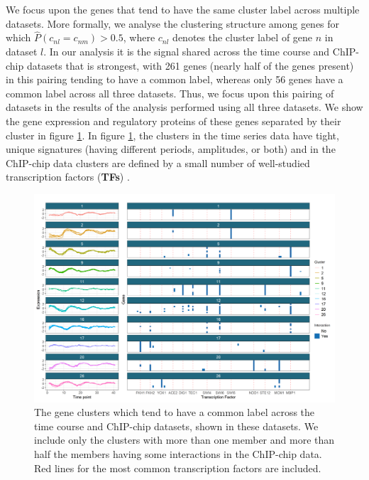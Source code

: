 \documentclass{bmcart}
\begin{document}
	We focus upon the genes that tend to have the same cluster label across multiple datasets. More formally, we analyse the clustering structure among genes for which $\hat{P}(c_{nl} = c_{nm}) > 0.5$, where $c_{nl}$ denotes the cluster label of gene $n$ in dataset $l$. In our analysis it is the signal shared across the time course and ChIP-chip datasets that is strongest, with 261 genes (nearly half of the genes present) in this pairing tending to have a common label, whereas only 56 genes have a common label across all three datasets. Thus, we focus upon this pairing of datasets in the results of the analysis performed using all three datasets. We show the gene expression and regulatory proteins of these genes separated by their cluster in figure \ref{fig:timepointChIPchipFused}. In figure \ref{fig:timepointChIPchipFused}, the clusters in the time series data have tight, unique signatures  (having different periods, amplitudes, or both) and in the ChIP-chip data clusters are defined by a small number of well-studied transcription factors (\textbf{TFs}) \citep[see table 2 of the Supplementary Material for details of these TFs, many of which are well known to regulate cell cycle expression,][]{simon2001serial}.
	
	\begin{figure}
		\centering
		\includegraphics[scale=0.62]{./Images/Yeast/timecourseChIPchipFused.png}
		\caption{The gene clusters which tend to have a common label across the time course and ChIP-chip datasets, shown in these datasets. We include only the clusters with more than one member and more than half the members having some interactions in the ChIP-chip data. Red lines for the most common transcription factors are included.}
		\label{fig:timepointChIPchipFused}
	\end{figure}
	
\end{document}
